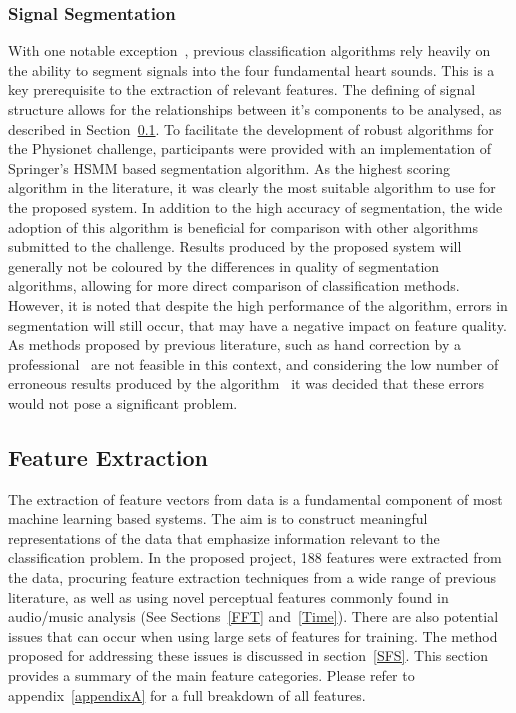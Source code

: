 \documentclass[titlepage, 12pt]{scrartcl} \usepackage{enumitem}
\begin{document}
\subsubsection{Signal Segmentation}
With one notable exception~\parencite{Langley2016}, previous classification
algorithms rely heavily on the ability to segment signals into the four
fundamental heart sounds. This is a key prerequisite to the extraction of
relevant features. The defining of signal structure allows for the
relationships between it's components to be analysed, as described in
Section~\ref{featEx}. To facilitate the development of robust algorithms for
the Physionet challenge, participants were provided with an implementation of
Springer's HSMM based segmentation algorithm. As the highest scoring algorithm
in the literature, it was clearly the most suitable algorithm to use for the
proposed system. In addition to the high accuracy of segmentation, the wide
adoption of this algorithm is beneficial for comparison with other algorithms
submitted to the challenge. Results produced by the proposed system will
generally not be coloured by the differences in quality of segmentation
algorithms, allowing for more direct comparison of classification methods.
However, it is noted that despite the high performance of the algorithm, errors
in segmentation will still occur, that may have a negative impact on feature
quality. As methods proposed by previous literature, such as hand correction by
a professional~\parencite[p.2203]{Liu2016} are not feasible in this context,
and considering the low number of erroneous results produced by the
algorithm~\parencite[p.2]{Goda2016} it was decided that these errors would not
pose a significant problem.


\subsection{Feature Extraction}\label{featEx}
The extraction of feature vectors from data is a fundamental component of most
machine learning based systems. The aim is to construct meaningful
representations of the data that emphasize information relevant to the
classification problem. In the proposed project, 188 features were extracted
from the data, procuring feature extraction techniques from a wide range of
previous literature, as well as using novel perceptual features commonly found
in audio/music analysis (See Sections~\ref{FFT} and~\ref{Time}).
There are also potential issues that can occur when using large sets of
features for training. The method proposed for addressing these issues is
discussed in section~\ref{SFS}. This section provides a summary of the main
feature categories. Please refer to appendix~\ref{appendixA} for a full
breakdown of all features.
\end{document}
